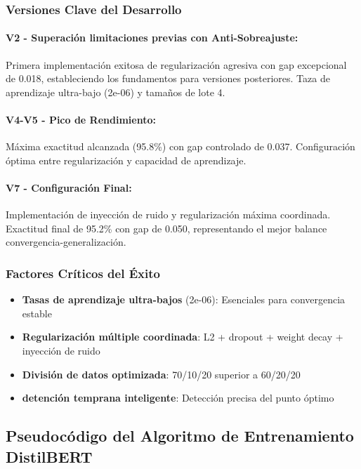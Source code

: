 \subsubsection{Versiones Clave del Desarrollo}

\paragraph{V2 - Superación limitaciones previas con Anti-Sobreajuste:}
Primera implementación exitosa de regularización agresiva con gap excepcional de 0.018, estableciendo los fundamentos para versiones posteriores. Taza de aprendizaje ultra-bajo (2e-06) y tamaños de lote 4.

\paragraph{V4-V5 - Pico de Rendimiento:}
Máxima exactitud alcanzada (95.8\%) con gap controlado de 0.037. Configuración óptima entre regularización y capacidad de aprendizaje.

\paragraph{V7 - Configuración Final:}
Implementación de inyección de ruido y regularización máxima coordinada. Exactitud final de 95.2\% con gap de 0.050, representando el mejor balance convergencia-generalización.

\subsubsection{Factores Críticos del Éxito}

\begin{itemize}
    \item \textbf{Tasas de aprendizaje ultra-bajos} (2e-06): Esenciales para convergencia estable
    \item \textbf{Regularización múltiple coordinada}: L2 + dropout + weight decay + inyección de ruido
    \item \textbf{División de datos optimizada}: 70/10/20 superior a 60/20/20
    \item \textbf{detención temprana inteligente}: Detección precisa del punto óptimo
\end{itemize}

\subsection{Pseudocódigo del Algoritmo de Entrenamiento DistilBERT}
\label{subsec:pseudocodigo_distilbert}

